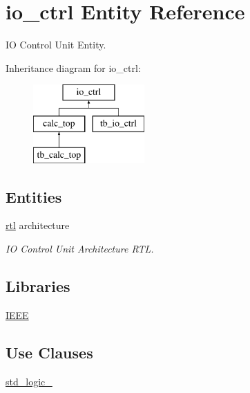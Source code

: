 \hypertarget{classio__ctrl}{}\section{io\+\_\+ctrl Entity Reference}
\label{classio__ctrl}


IO Control Unit Entity.  


Inheritance diagram for io\+\_\+ctrl\+:\begin{figure}[H]
\begin{center}
\leavevmode
\includegraphics[height=3.000000cm]{classio__ctrl}
\end{center}
\end{figure}
\subsection*{Entities}
\begin{DoxyCompactItemize}
\item 
\hyperlink{classio__ctrl_1_1rtl}{rtl} architecture
\begin{DoxyCompactList}\small\item\em IO Control Unit Architecture R\+TL. \end{DoxyCompactList}\end{DoxyCompactItemize}
\subsection*{Libraries}
 \begin{DoxyCompactItemize}
\item 
\hyperlink{classio__ctrl_ae4f03c286607f3181e16b9aa12d0c6d4}{I\+E\+EE} 
\end{DoxyCompactItemize}
\subsection*{Use Clauses}
 \begin{DoxyCompactItemize}
\item 
\hyperlink{classio__ctrl_acd03516902501cd1c7296a98e22c6fcb}{std\+\_\+logic\+\_}   
\end{DoxyCompactItemize}
